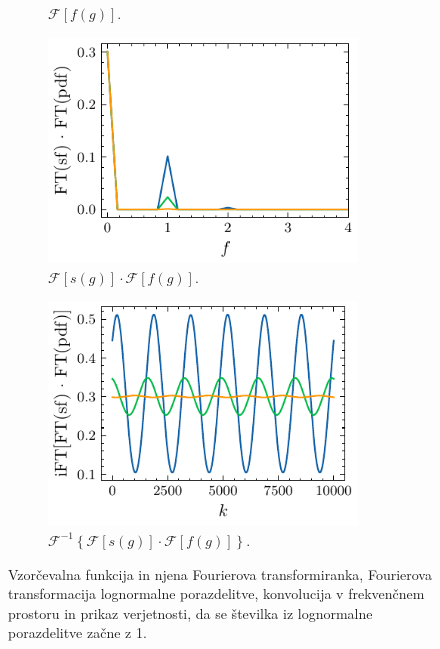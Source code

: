 \documentclass[11pt, oneside]{article}
\theoremstyle{definition}
\begin{document}
\begin{figure}[h!]
\begin{subfigure}[b]{0.49\textwidth}
        \caption{$\mathcal{F}[f(g)]$.}
    \end{subfigure}
    \hfill
    \begin{subfigure}[b]{0.49\textwidth}
        \centering
        \includegraphics[width=0.9\textwidth]{lognorm_conv.pdf}
        \caption{$\mathcal{F}[s(g)] \cdot \mathcal{F}[f(g)]$.}
    \end{subfigure}
    \hfill
    \begin{subfigure}[b]{0.49\textwidth}
        \centering
        \includegraphics[width=0.9\textwidth]{lognorm_ost.pdf}
        \caption{$\mathcal{F}^{-1} \left \{ \mathcal{F} [s(g)] \cdot \mathcal{F} [f(g)] \right \}$.}
        \label{fig: e}
    \end{subfigure}
    \caption{Vzorčevalna funkcija in njena Fourierova transformiranka, Fourierova transformacija lognormalne porazdelitve,
        konvolucija v frekvenčnem prostoru in prikaz verjetnosti, da se številka iz lognormalne porazdelitve začne z 1.}
    \label{fig: FFT}
\end{figure}
\end{document}
